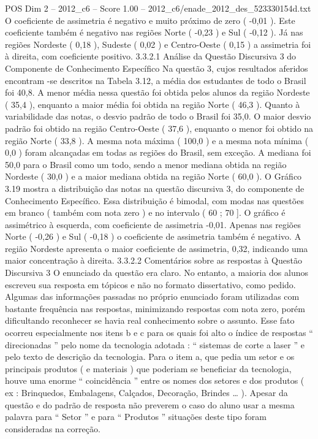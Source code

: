 \begin{textsample}{POS Dim 2 – 2012\_c6 – Score 1.00 – 2012\_c6/enade\_2012\_des\_523330154d.txt}
O coeficiente de assimetria é negativo e muito próximo de zero ( -0,01 ).
Este coeficiente também é negativo nas regiões Norte ( -0,23 ) e Sul ( -0,12 ).
Já nas regiões Nordeste ( 0,18 ), Sudeste ( 0,02 ) e Centro-Oeste ( 0,15 ) a assimetria foi à direita, com coeficiente positivo. 3.3.2.1 Análise da Questão Discursiva 3 do Componente de Conhecimento Específico Na questão 3, cujos resultados aferidos encontram -se descritos na Tabela 3.12, a média dos estudantes de todo o Brasil foi 40,8.
A menor média nessa questão foi obtida pelos alunos da região Nordeste ( 35,4 ), enquanto a maior média foi obtida na região Norte ( 46,3 ).
Quanto à variabilidade das notas, o desvio padrão de todo o Brasil foi 35,0.
O maior desvio padrão foi obtido na região Centro-Oeste ( 37,6 ), enquanto o menor foi obtido na região Norte ( 33,8 ).
A mesma nota máxima ( 100,0 ) e a mesma nota mínima ( 0,0 ) foram alcançadas em todas as regiões do Brasil, sem exceção.
A mediana foi 50,0 para o Brasil como um todo, sendo a menor mediana obtida na região Nordeste ( 30,0 ) e a maior mediana obtida na região Norte ( 60,0 ).
O Gráfico 3.19 mostra a distribuição das notas na questão discursiva 3, do componente de Conhecimento Específico.
Essa distribuição é bimodal, com modas nas questões em branco ( também com nota zero ) e no intervalo ( 60 ; 70 ].
O gráfico é assimétrico à esquerda, com coeficiente de assimetria -0,01.
Apenas nas regiões Norte ( -0,26 ) e Sul ( -0,18 ) o coeficiente de assimetria também é negativo.
A região Nordeste apresenta o maior coeficiente de assimetria, 0,32, indicando uma maior concentração à direita. 3.3.2.2 Comentários sobre as respostas à Questão Discursiva 3 O enunciado da questão era claro.
No entanto, a maioria dos alunos escreveu sua resposta em tópicos e não no formato dissertativo, como pedido.
Algumas das informações passadas no próprio enunciado foram utilizadas com bastante frequência nas respostas, minimizando respostas com nota zero, porém dificultando reconhecer se havia real conhecimento sobre o assunto.
Esse fato ocorreu especialmente nos itens b e c para os quais foi alto o índice de respostas “ direcionadas ” pelo nome da tecnologia adotada : “ sistemas de corte a laser ” e pelo texto de descrição da tecnologia.
Para o item a, que pedia um setor e os principais produtos ( e materiais ) que poderiam se beneficiar da tecnologia, houve uma enorme “ coincidência ” entre os nomes dos setores e dos produtos ( ex : Brinquedos, Embalagens, Calçados, Decoração, Brindes … ).
Apesar da questão e do padrão de resposta não preverem o caso do aluno usar a mesma palavra para “ Setor ” e para “ Produtos ” situações deste tipo foram consideradas na correção.

\end{textsample}
